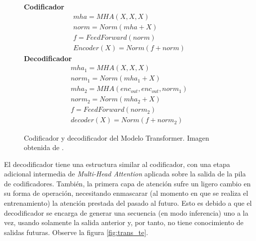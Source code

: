 \begin{figure}[ht!]
\begin{minipage}{.4\textwidth}
    \end{minipage}
    \begin{minipage}{.5\textwidth}
        \textbf{Codificador}
        \begin{equation*}
            \begin{split}
                mha = MHA(X, X, X)\\
                norm = Norm( mha + X)\\
                f = FeedForward(norm)\\
                Encoder(X) = Norm(f + norm)
            \end{split}
            \label{eq:trans_enc}
        \end{equation*}
        \textbf{Decodificador}
        \begin{equation*}
            \begin{split}
                mha_1 = MHA(X, X, X)\\
                norm_1 = Norm( mha_1 + X)\\
                mha_2 = MHA(enc_{out}, enc_{out}, norm_1)\\
                norm_2 = Norm( mha_2 + X)\\
                f = FeedForward(norm_2)\\
                decoder(X) = Norm(f + norm_2)
            \end{split}
            \label{eq:trans_dec}
        \end{equation*}
    \end{minipage}
    \caption{Codificador y decodificador del Modelo Transformer. Imagen obtenida de \cite{Vaswani}.}
    \label{fig:trans_encoder}
\end{figure}


El decodificador tiene una estructura similar al codificador, con una etapa adicional intermedia
de \textit{Multi-Head Attention} aplicada sobre la salida de la pila de codificadores. También, la
primera capa de atención sufre un ligero cambio en su forma de operación, necesitando enmascarar (al
momento en que se realiza el entrenamiento) la atención prestada del pasado al futuro. Esto es debido
a que el decodificador se encarga de generar una secuencia (en modo inferencia) uno a la vez, usando
solamente la salida anterior y, por tanto, no tiene conocimiento de salidas futuras. Observe la figura
\ref{fig:trans_te}.


